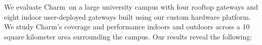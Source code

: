 



We evaluate Charm\ on a large university campus with four rooftop gateways and eight indoor user-deployed gateways built using our custom hardware platform. We study Charm's coverage and performance indoors and outdoors  across a 10 square kilometer area surrounding the campus. Our results reveal the following:

